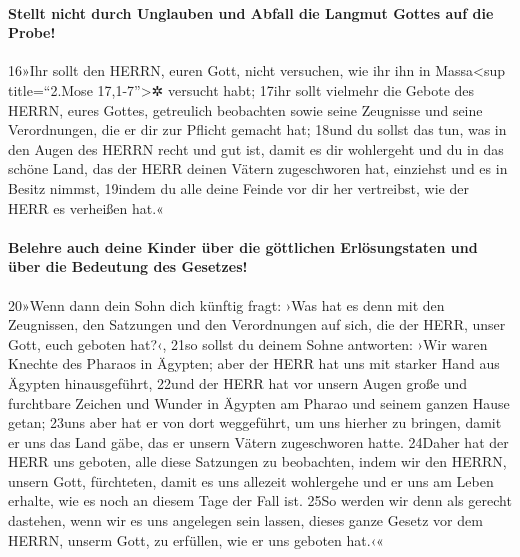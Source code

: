 \hypertarget{stellt-nicht-durch-unglauben-und-abfall-die-langmut-gottes-auf-die-probe}{%
\paragraph{Stellt nicht durch Unglauben und Abfall die Langmut Gottes
auf die
Probe!}\label{stellt-nicht-durch-unglauben-und-abfall-die-langmut-gottes-auf-die-probe}}

16»Ihr sollt den HERRN, euren Gott, nicht versuchen, wie ihr ihn in
Massa\textless sup title=``2.Mose 17,1-7''\textgreater✲ versucht habt;
17ihr sollt vielmehr die Gebote des HERRN, eures Gottes, getreulich
beobachten sowie seine Zeugnisse und seine Verordnungen, die er dir zur
Pflicht gemacht hat; 18und du sollst das tun, was in den Augen des HERRN
recht und gut ist, damit es dir wohlergeht und du in das schöne Land,
das der HERR deinen Vätern zugeschworen hat, einziehst und es in Besitz
nimmst, 19indem du alle deine Feinde vor dir her vertreibst, wie der
HERR es verheißen hat.«

\hypertarget{belehre-auch-deine-kinder-uxfcber-die-guxf6ttlichen-erluxf6sungstaten-und-uxfcber-die-bedeutung-des-gesetzes}{%
\paragraph{Belehre auch deine Kinder über die göttlichen Erlösungstaten
und über die Bedeutung des
Gesetzes!}\label{belehre-auch-deine-kinder-uxfcber-die-guxf6ttlichen-erluxf6sungstaten-und-uxfcber-die-bedeutung-des-gesetzes}}

20»Wenn dann dein Sohn dich künftig fragt: ›Was hat es denn mit den
Zeugnissen, den Satzungen und den Verordnungen auf sich, die der HERR,
unser Gott, euch geboten hat?‹, 21so sollst du deinem Sohne antworten:
›Wir waren Knechte des Pharaos in Ägypten; aber der HERR hat uns mit
starker Hand aus Ägypten hinausgeführt, 22und der HERR hat vor unsern
Augen große und furchtbare Zeichen und Wunder in Ägypten am Pharao und
seinem ganzen Hause getan; 23uns aber hat er von dort weggeführt, um uns
hierher zu bringen, damit er uns das Land gäbe, das er unsern Vätern
zugeschworen hatte. 24Daher hat der HERR uns geboten, alle diese
Satzungen zu beobachten, indem wir den HERRN, unsern Gott, fürchteten,
damit es uns allezeit wohlergehe und er uns am Leben erhalte, wie es
noch an diesem Tage der Fall ist. 25So werden wir denn als gerecht
dastehen, wenn wir es uns angelegen sein lassen, dieses ganze Gesetz vor
dem HERRN, unserm Gott, zu erfüllen, wie er uns geboten hat.‹«

